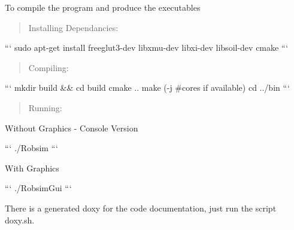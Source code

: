 
\begin{DoxyItemize}
\item To compile the program and produce the executables
\end{DoxyItemize}

\begin{quotation}
Installing Dependancies\-:

\end{quotation}


``` sudo apt-\/get install freeglut3-\/dev libxmu-\/dev libxi-\/dev libsoil-\/dev cmake ```

\begin{quotation}
Compiling\-:

\end{quotation}


``` mkdir build \&\& cd build cmake .. make (-\/j \#cores if available) cd ../bin ``` \begin{quotation}
Running\-:

\end{quotation}


Without Graphics -\/ Console Version

``` ./\-Robsim ```

With Graphics

``` ./\-Robsim\-Gui ```


\begin{DoxyItemize}
\item There is a generated doxy for the code documentation, just run the script doxy.\-sh. 
\end{DoxyItemize}